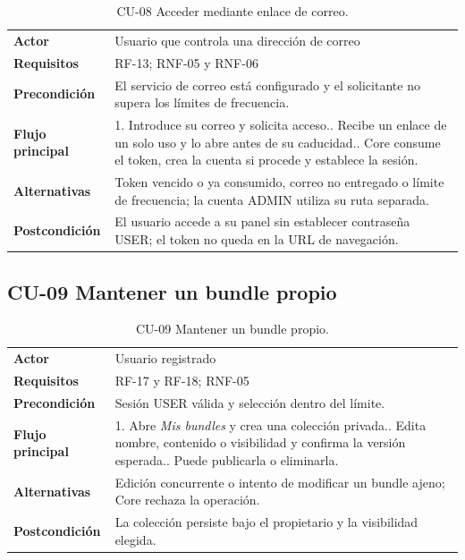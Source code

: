 \begin{table}[H]
\centering
\begin{tabularx}{\textwidth}{p{}X}
\toprule
\textbf{Actor} & Usuario que controla una dirección de correo\\
\textbf{Requisitos} & RF-13; RNF-05 y RNF-06\\
\textbf{Precondición} & El servicio de correo está configurado y el solicitante no supera los límites de frecuencia.\\
\textbf{Flujo principal} & 1. Introduce su correo y solicita acceso.\newline
2. Recibe un enlace de un solo uso y lo abre antes de su caducidad.\newline
3. Core consume el token, crea la cuenta si procede y establece la sesión.\\
\textbf{Alternativas} & Token vencido o ya consumido, correo no entregado o límite de frecuencia; la cuenta ADMIN utiliza su ruta separada.\\
\textbf{Postcondición} & El usuario accede a su panel sin establecer contraseña USER; el token no queda en la URL de navegación.\\
\bottomrule
\end{tabularx}
\caption{CU-08 Acceder mediante enlace de correo.}
\label{tabla:cu-enlace-acceso}
\end{table}

\subsection{CU-09 Mantener un bundle propio}

\begin{table}[H]
\centering
\begin{tabularx}{\textwidth}{p{}X}
\toprule
\textbf{Actor} & Usuario registrado\\
\textbf{Requisitos} & RF-17 y RF-18; RNF-05\\
\textbf{Precondición} & Sesión USER válida y selección dentro del límite.\\
\textbf{Flujo principal} & 1. Abre \emph{Mis bundles} y crea una colección privada.\newline
2. Edita nombre, contenido o visibilidad y confirma la versión esperada.\newline
3. Puede publicarla o eliminarla.\\
\textbf{Alternativas} & Edición concurrente o intento de modificar un bundle ajeno; Core rechaza la operación.\\
\textbf{Postcondición} & La colección persiste bajo el propietario y la visibilidad elegida.\\
\bottomrule
\end{tabularx}
\caption{CU-09 Mantener un bundle propio.}
\label{tabla:cu-bundle-propio}
\end{table}


